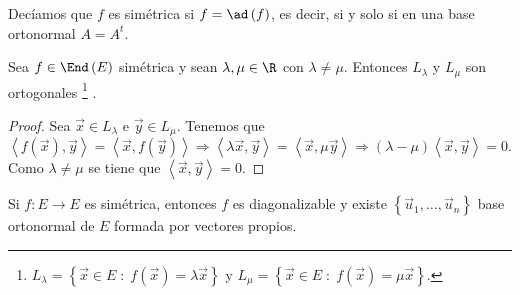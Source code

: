 Decíamos que $\displaystyle f $ es simétrica si $\displaystyle f = \ad\left(f\right) $, es decir, si y solo si en una base ortonormal $\displaystyle A = A^{t} $.
\begin{flema}[]
	\normalfont Sea $\displaystyle f\in \End\left(E\right) $ simétrica y sean $\displaystyle \lambda, \mu \in \R $ con $\displaystyle \lambda \neq \mu  $. Entonces $\displaystyle L_{\lambda }  $ y  $\displaystyle L_{\mu } $ son ortogonales \footnote{ $\displaystyle L_{\lambda } = \left\{ \vec{x} \in E \; : \; f\left(\vec{x}\right) = \lambda \vec{x}\right\}  $ y $\displaystyle L_{\mu} = \left\{ \vec{x} \in E \; : \; f\left(\vec{x}\right) = \mu \vec{x}\right\}  $. } .
\end{flema}
\begin{proof}
Sea $\displaystyle \vec{x} \in L_{\lambda } $ e $\displaystyle \vec{y} \in L_{\mu} $. Tenemos que 
\[\left\langle f\left(\vec{x}\right), \vec{y} \right\rangle = \left\langle \vec{x}, f\left(\vec{y}\right) \right\rangle \Rightarrow \left\langle \lambda\vec{x}, \vec{y} \right\rangle = \left\langle \vec{x}, \mu \vec{y} \right\rangle \Rightarrow \left(\lambda - \mu \right)\left\langle \vec{x}, \vec{y} \right\rangle = 0 .\]
Como $\displaystyle \lambda \neq \mu  $ se tiene que $\displaystyle \left\langle \vec{x}, \vec{y} \right\rangle  = 0 $.
\end{proof}
\begin{ftheorem}
	\normalfont Si $\displaystyle f: E \to E $ es simétrica, entonces $\displaystyle f $ es diagonalizable y existe $\displaystyle \left\{ \vec{u}_{1}, \ldots, \vec{u}_{n}\right\}  $ base ortonormal de $\displaystyle E $ formada por vectores propios.
\end{ftheorem}
